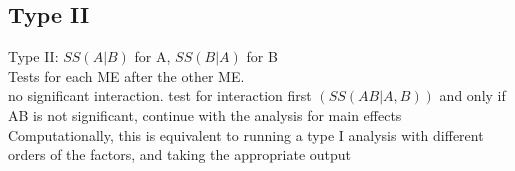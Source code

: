 \documentclass{article}
\begin{document}
\begin{flushleft}
\section*{Type II}
Type II: $SS(A | B)$ for A, $SS(B | A)$ for B\\
Tests for each ME after the other ME.\\
no significant interaction.  test for interaction first $(SS(AB | A, B))$ and only if AB is not significant, continue with the analysis for main effects\\
Computationally, this is equivalent to running a type I analysis with different orders of the factors, and taking the appropriate output\\

\end{flushleft}
\end{document}
